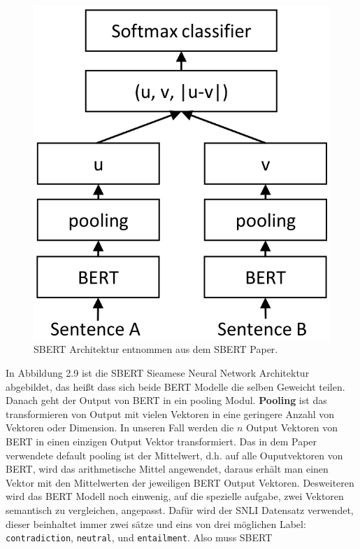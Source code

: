 \documentclass[12pt,letterpaper,ngerman]{article}
\begin{document}
\begin{figure}[H]
  \begin{center}
    \includegraphics[scale=0.3]{SBERT.png}
  \end{center}
  \caption{SBERT Architektur entnommen aus dem SBERT Paper.}
\end{figure}
In Abbildung 2.9 ist die SBERT Sieamese Neural Network Architektur abgebildet,
das heißt dass sich beide BERT Modelle die selben Geweicht teilen. Danach
geht der Output von BERT in ein pooling Modul. {\bf Pooling} ist das transformieren
von Output mit vielen Vektoren in eine geringere Anzahl von Vektoren oder 
Dimension. In unseren Fall werden die $n$ Output Vektoren von BERT in einen 
einzigen Output Vektor transformiert. Das in dem Paper verwendete
default pooling ist der Mittelwert, d.h. auf alle Ouputvektoren von BERT,
wird das arithmetische Mittel angewendet, daraus erhält man einen Vektor
mit den Mittelwerten der jeweiligen BERT Output Vektoren. Desweiteren wird
das BERT Modell noch einwenig, auf die spezielle aufgabe, zwei Vektoren
semantisch zu vergleichen, angepasst. Dafür wird der SNLI Datensatz verwendet,
dieser beinhaltet immer zwei sätze und eins von drei möglichen Label:
\verb|contradiction|, \verb|neutral|, und \verb|entailment|. Also muss SBERT
\end{document}

